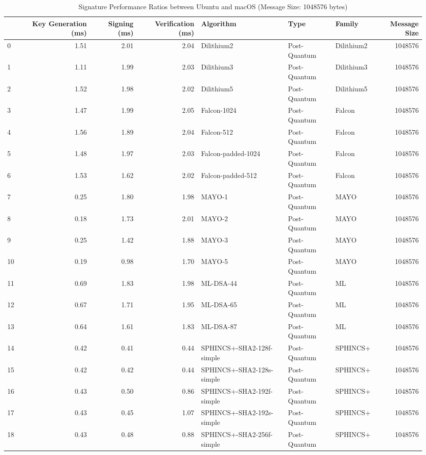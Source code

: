 \begin{table}
\caption{Signature Performance Ratios between Ubuntu and macOS (Message Size: 1048576 bytes)}
\label{tab:desktop_sig_ratio_1048576}
\begin{tabular}{lrrrlllr}
\toprule
 & Key Generation (ms) & Signing (ms) & Verification (ms) & Algorithm & Type & Family & Message Size \\
\midrule
0 & 1.51 & 2.01 & 2.04 & Dilithium2 & Post-Quantum & Dilithium2 & 1048576 \\
1 & 1.11 & 1.99 & 2.03 & Dilithium3 & Post-Quantum & Dilithium3 & 1048576 \\
2 & 1.52 & 1.98 & 2.02 & Dilithium5 & Post-Quantum & Dilithium5 & 1048576 \\
3 & 1.47 & 1.99 & 2.05 & Falcon-1024 & Post-Quantum & Falcon & 1048576 \\
4 & 1.56 & 1.89 & 2.04 & Falcon-512 & Post-Quantum & Falcon & 1048576 \\
5 & 1.48 & 1.97 & 2.03 & Falcon-padded-1024 & Post-Quantum & Falcon & 1048576 \\
6 & 1.53 & 1.62 & 2.02 & Falcon-padded-512 & Post-Quantum & Falcon & 1048576 \\
7 & 0.25 & 1.80 & 1.98 & MAYO-1 & Post-Quantum & MAYO & 1048576 \\
8 & 0.18 & 1.73 & 2.01 & MAYO-2 & Post-Quantum & MAYO & 1048576 \\
9 & 0.25 & 1.42 & 1.88 & MAYO-3 & Post-Quantum & MAYO & 1048576 \\
10 & 0.19 & 0.98 & 1.70 & MAYO-5 & Post-Quantum & MAYO & 1048576 \\
11 & 0.69 & 1.83 & 1.98 & ML-DSA-44 & Post-Quantum & ML & 1048576 \\
12 & 0.67 & 1.71 & 1.95 & ML-DSA-65 & Post-Quantum & ML & 1048576 \\
13 & 0.64 & 1.61 & 1.83 & ML-DSA-87 & Post-Quantum & ML & 1048576 \\
14 & 0.42 & 0.41 & 0.44 & SPHINCS+-SHA2-128f-simple & Post-Quantum & SPHINCS+ & 1048576 \\
15 & 0.42 & 0.42 & 0.44 & SPHINCS+-SHA2-128s-simple & Post-Quantum & SPHINCS+ & 1048576 \\
16 & 0.43 & 0.50 & 0.86 & SPHINCS+-SHA2-192f-simple & Post-Quantum & SPHINCS+ & 1048576 \\
17 & 0.43 & 0.45 & 1.07 & SPHINCS+-SHA2-192s-simple & Post-Quantum & SPHINCS+ & 1048576 \\
18 & 0.43 & 0.48 & 0.88 & SPHINCS+-SHA2-256f-simple & Post-Quantum & SPHINCS+ & 1048576 \\

\end{tabular}
\end{table}
